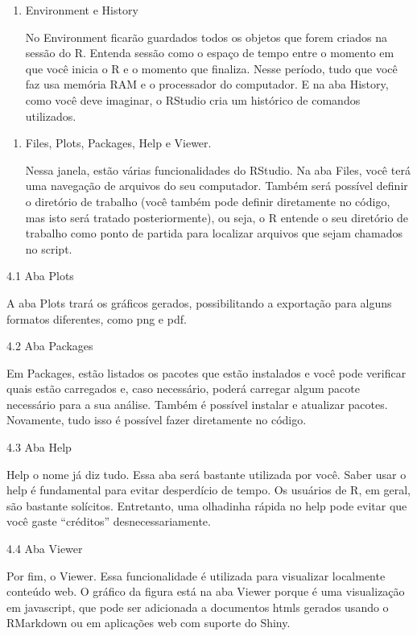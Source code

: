\documentclass[]{book}
\providecommand{\tightlist}{%
  \setlength{\itemsep}{0pt}\setlength{\parskip}{0pt}}
\begin{document}
\begin{enumerate}
\def\labelenumi{\arabic{enumi}.}
\setcounter{enumi}{2}
\tightlist
\item
  Environment e History

  No Environment ficarão guardados todos os objetos que forem criados na
  sessão do R. Entenda sessão como o espaço de tempo entre o momento em
  que você inicia o R e o momento que finaliza. Nesse período, tudo que
  você faz usa memória RAM e o processador do computador. E na aba
  History, como você deve imaginar, o RStudio cria um histórico de
  comandos utilizados.
\end{enumerate}

\begin{enumerate}
\def\labelenumi{\arabic{enumi}.}
\setcounter{enumi}{3}
\tightlist
\item
  Files, Plots, Packages, Help e Viewer.

  Nessa janela, estão várias funcionalidades do RStudio. Na aba Files,
  você terá uma navegação de arquivos do seu computador. Também será
  possível definir o diretório de trabalho (você também pode definir
  diretamente no código, mas isto será tratado posteriormente), ou seja,
  o R entende o seu diretório de trabalho como ponto de partida para
  localizar arquivos que sejam chamados no script.
\end{enumerate}

4.1 Aba Plots

A aba Plots trará os gráficos gerados, possibilitando a exportação para
alguns formatos diferentes, como png e pdf.

4.2 Aba Packages

Em Packages, estão listados os pacotes que estão instalados e você pode
verificar quais estão carregados e, caso necessário, poderá carregar
algum pacote necessário para a sua análise. Também é possível instalar e
atualizar pacotes. Novamente, tudo isso é possível fazer diretamente no
código.

4.3 Aba Help

Help o nome já diz tudo. Essa aba será bastante utilizada por você.
Saber usar o help é fundamental para evitar desperdício de tempo. Os
usuários de R, em geral, são bastante solícitos. Entretanto, uma
olhadinha rápida no help pode evitar que você gaste ``créditos''
desnecessariamente.

4.4 Aba Viewer

Por fim, o Viewer. Essa funcionalidade é utilizada para visualizar
localmente conteúdo web. O gráfico da figura está na aba Viewer porque é
uma visualização em javascript, que pode ser adicionada a documentos
htmls gerados usando o RMarkdown ou em aplicações web com suporte do
Shiny.
\end{document}
